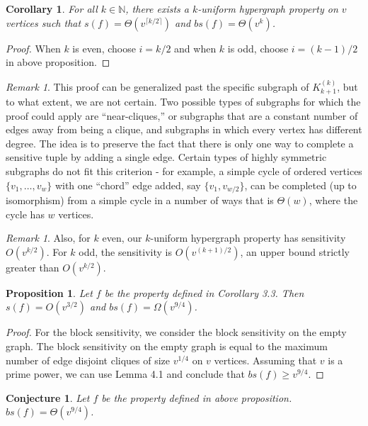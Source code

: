 \documentclass[psamsfonts]{amsart}
\newtheorem{cor}[theorem]{Corollary}
\newtheorem{prop}[theorem]{Proposition}
\newtheorem{conj}{Conjecture}
\theoremstyle{definition}
\theoremstyle{remark}
\newtheorem{rem}[theorem]{Remark}
\numberwithin{equation}{section}
\begin{document}
	\begin{cor}
		For all $k \in \mathbb{N}$, there exists a $k$-uniform hypergraph property on $v$ vertices such that $s(f) = \Theta(v^{\lceil k/2 \rceil})$ and $bs(f)= \Theta (v^k)$.
	\end{cor}
	\begin{proof}
		When $k$ is even, choose $i=k/2$ and when $k$ is odd, choose $i=(k-1)/2$ in above proposition.
	\end{proof}
	
	\begin{rem}
		This proof can be generalized past the specific subgraph of  $K_{k+1}^{(k)}$, but to what extent, we are not certain.  Two possible types of subgraphs for which the proof could apply are ``near-cliques,'' or subgraphs that are a constant number of edges away from being a clique, and subgraphs in which every vertex has different degree.  The idea is to preserve the fact that there is only one way to complete a sensitive tuple by adding a single edge.  Certain types of highly symmetric subgraphs do not fit this criterion - for example, a simple cycle of ordered vertices $\{v_1, \ldots , v_w\}$ with one ``chord'' edge added, say $\{v_1,v_{w/2}\}$, can be completed (up to isomorphism) from a simple cycle in a number of ways that is $\Theta(w)$, where the cycle has $w$ vertices.  
	\end{rem}
	
	\begin{rem}
		Also, for $k$ even, our $k$-uniform hypergraph property has sensitivity $O(v^{k/2})$.  For $k$ odd, the sensitivity is $O(v^{(k+1)/2})$, an upper bound strictly greater than $O(v^{k/2})$.
	\end{rem}

\begin{prop}
		Let $f$ be the property defined in Corollary 3.3. Then $s(f) = O(v^{3/2})$ and $bs(f) = \Omega(v^{9/4})$.
	\end{prop}
	
	\begin{proof}
		For the block sensitivity, we consider the block sensitivity on the empty graph. The block sensitivity on the empty graph is equal to the maximum number of edge disjoint cliques of size $v^{1/4}$ on $v$ vertices. Assuming that $v$ is a prime power, we can use Lemma 4.1 and conclude that $bs(f) \geq v^{9/4}$.
	\end{proof}
	\begin{conj}
		Let $f$ be the property defined in above proposition. $bs(f) = \Theta(v^{9/4})$.
	\end{conj}
	
\end{document}
